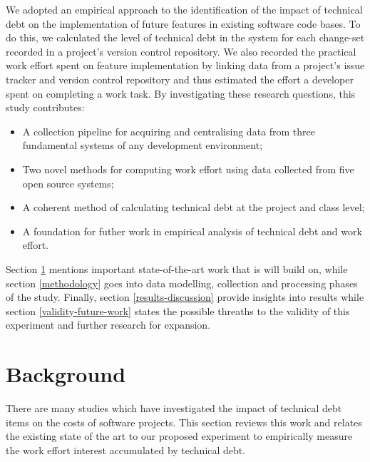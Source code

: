 \documentclass{mpaper}
\begin{document}
We adopted an empirical approach to the identification of the impact of
technical debt on the implementation of future features in existing software
code bases. To do this, we calculated the level of technical debt in the system
for each change-set recorded in a project's version control repository. We also
recorded the practical work effort spent on feature implementation by linking
data from a project's issue tracker and version control repository and thus
estimated the effort a developer spent on completing a work task. By
investigating these research questions, this study contributes:
\begin{itemize}
  \item A collection pipeline for acquiring and centralising data from three
  fundamental systems of any development environment;
  \item Two novel methods for computing work effort using data collected from
  five open source systems;
  \item A coherent method of calculating technical debt at the project and class
  level;
  \item A foundation for futher work in empirical analysis of technical debt and
  work effort.
\end{itemize}

Section \ref{background} mentions important state-of-the-art work that is will
build on, while section \ref{methodology} goes into data modelling, collection
and processing phases of the study. Finally, section \ref{results-discussion}
provide insights into results while section \ref{validity-future-work} states
the possible threaths to the validity of this experiment and further research
for expansion.

\section{Background}
\label{background}

There are many studies which have investigated the impact of technical
debt items on the costs of software projects. This section reviews this work
and relates the existing state of the art to our proposed experiment to
empirically measure the work effort interest accumulated by technical debt.
\end{document}
